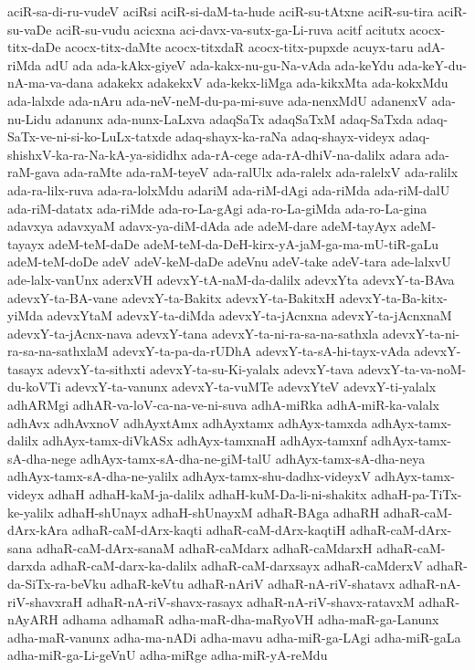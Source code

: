 {aciR-sa-di-ru-vudeV
aciRsi
aciR-si-daM-ta-hude
aciR-su-tAtxne
aciR-su-tira
aciR-su-vaDe
aciR-su-vudu
acicxna
aci-davx-va-sutx-ga-Li-ruva
acitf
acitutx
acocx-titx-daDe
acocx-titx-daMte
acocx-titxdaR
acocx-titx-pupxde
acuyx-taru
adA-riMda
adU
ada
ada-kAkx-giyeV
ada-kakx-nu-gu-Na-vAda
ada-keYdu
ada-keY-du-nA-ma-va-dana
adakekx
adakekxV
ada-kekx-liMga
ada-kikxMta
ada-kokxMdu
ada-lalxde
ada-nAru
ada-neV-neM-du-pa-mi-suve
ada-nenxMdU
adanenxV
ada-nu-Lidu
adanunx
ada-nunx-LaLxva
adaqSaTx
adaqSaTxM
adaq-SaTxda
adaq-SaTx-ve-ni-si-ko-LuLx-tatxde
adaq-shayx-ka-raNa
adaq-shayx-videyx
adaq-shishxV-ka-ra-Na-kA-ya-sididhx
ada-rA-cege
ada-rA-dhiV-na-dalilx
adara
ada-raM-gava
ada-raMte
ada-raM-teyeV
ada-ralUlx
ada-ralelx
ada-ralelxV
ada-ralilx
ada-ra-lilx-ruva
ada-ra-lolxMdu
adariM
ada-riM-dAgi
ada-riMda
ada-riM-dalU
ada-riM-datatx
ada-riMde
ada-ro-La-gAgi
ada-ro-La-giMda
ada-ro-La-gina
adavxya
adavxyaM
adavx-ya-diM-dAda
ade
adeM-dare
adeM-tayAyx
adeM-tayayx
adeM-teM-daDe
adeM-teM-da-DeH-kirx-yA-jaM-ga-ma-mU-tiR-gaLu
adeM-teM-doDe
adeV
adeV-keM-daDe
adeVnu
adeV-take
adeV-tara
ade-lalxvU
ade-lalx-vanUnx
aderxVH
adevxY-tA-naM-da-dalilx
adevxYta
adevxY-ta-BAva
adevxY-ta-BA-vane
adevxY-ta-Bakitx
adevxY-ta-BakitxH
adevxY-ta-Ba-kitx-yiMda
adevxYtaM
adevxY-ta-diMda
adevxY-ta-jAcnxna
adevxY-ta-jAcnxnaM
adevxY-ta-jAcnx-nava
adevxY-tana
adevxY-ta-ni-ra-sa-na-sathxla
adevxY-ta-ni-ra-sa-na-sathxlaM
adevxY-ta-pa-da-rUDhA
adevxY-ta-sA-hi-tayx-vAda
adevxY-tasayx
adevxY-ta-sithxti
adevxY-ta-su-Ki-yalalx
adevxY-tava
adevxY-ta-va-noM-du-koVTi
adevxY-ta-vanunx
adevxY-ta-vuMTe
adevxYteV
adevxY-ti-yalalx
adhARMgi
adhAR-va-loV-ca-na-ve-ni-suva
adhA-miRka
adhA-miR-ka-valalx
adhAvx
adhAvxnoV
adhAyxtAmx
adhAyxtamx
adhAyx-tamxda
adhAyx-tamx-dalilx
adhAyx-tamx-diVkASx
adhAyx-tamxnaH
adhAyx-tamxnf
adhAyx-tamx-sA-dha-nege
adhAyx-tamx-sA-dha-ne-giM-talU
adhAyx-tamx-sA-dha-neya
adhAyx-tamx-sA-dha-ne-yalilx
adhAyx-tamx-shu-dadhx-videyxV
adhAyx-tamx-videyx
adhaH
adhaH-kaM-ja-dalilx
adhaH-kuM-Da-li-ni-shakitx
adhaH-pa-TiTx-ke-yalilx
adhaH-shUnayx
adhaH-shUnayxM
adhaR-BAga
adhaRH
adhaR-caM-dArx-kAra
adhaR-caM-dArx-kaqti
adhaR-caM-dArx-kaqtiH
adhaR-caM-dArx-sana
adhaR-caM-dArx-sanaM
adhaR-caMdarx
adhaR-caMdarxH
adhaR-caM-darxda
adhaR-caM-darx-ka-dalilx
adhaR-caM-darxsayx
adhaR-caMderxV
adhaR-da-SiTx-ra-beVku
adhaR-keVtu
adhaR-nAriV
adhaR-nA-riV-shatavx
adhaR-nA-riV-shavxraH
adhaR-nA-riV-shavx-rasayx
adhaR-nA-riV-shavx-ratavxM
adhaR-nAyARH
adhama
adhamaR
adha-maR-dha-maRyoVH
adha-maR-ga-Lanunx
adha-maR-vanunx
adha-ma-nADi
adha-mavu
adha-miR-ga-LAgi
adha-miR-gaLa
adha-miR-ga-Li-geVnU
adha-miRge
adha-miR-yA-reMdu
}
